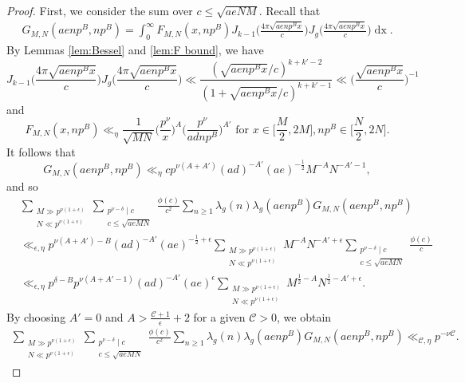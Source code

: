 \documentclass[12pt]{amsart}
\theoremstyle{plain}
\theoremstyle{definition}
\begin{document}
\begin{proof}
First, we consider the sum over $c\leq \sqrt{aeNM}$. Recall that
    \begin{align*}
    G_{M,N}(aenp^B, np^B)
    = \int_0^\infty F_{M, N}(x, np^B)
    J_{k-1}\Big(\frac{4\pi \sqrt{aenp^B x}}{c}\Big)
    J_{g}\Big(\frac{4\pi \sqrt{aenp^B x}}{c}\Big)
    \mathop{dx}.
    \end{align*}
By Lemmas \ref{lem:Bessel} and \ref{lem:F bound}, we have 
    \[
     J_{k-1}\Big(\frac{4\pi \sqrt{aenp^B x}}{c}\Big)J_{g}\Big(\frac{4\pi \sqrt{aenp^B x}}{c}\Big)
  \ll
     \frac{(\sqrt{aenp^B x}/c)^{k+k'-2}}
     {(1+\sqrt{aenp^Bx}/c)^{k+k'-1}} \ll \bigg(\frac{\sqrt{aenp^Bx}}{c}\bigg)^{-1}
    \]
and    
    \[
    F_{M, N}(x, np^B)
    \ll_{\eta}  \frac{1}{\sqrt{MN}}
    \Big(\frac{p^\nu }{x}\Big)^{A}
    \Big(\frac{p^\nu}{adnp^B}\Big)^{A'} \,\, \text{for} \,\, x\in \Big[\frac{M}{2}, 2M\Big], np^B\in \Big[\frac{N}{2}, 2N\Big].
    \]
 It follows that       
 \[
    G_{M,N}(aenp^B, np^B)    \ll_{\eta}  c p^{\nu(A+A')}(ad)^{-A'}(ae)^{-\frac12}M^{-A}N^{-A'-1} , 
    \] 
    and so
    \begin{align*}
 & \sum_{\substack{M \gg p^{\nu(1+\epsilon)}\\N\ll p^{\nu(1+\epsilon)}}}   \sum_{\substack{p^{\nu-\delta} \mid c\\c\leq\sqrt{aeMN}}} \frac{\phi(c)}{c^2} 
    \sum_{n\geq 1}
    \lambda_g(n) \lambda_g(aenp^B) G_{M,N}(aenp^B, np^B)\\&\ll_{\epsilon,\eta}   
   p^{\nu(A+A')-B}(ad)^{-A'}(ae)^{-\frac12+\epsilon}  \sum_{\substack{M \gg p^{\nu(1+\epsilon)}\\N\ll p^{\nu(1+\epsilon)}}}   M^{-A}N^{-A'+\epsilon}\sum_{\substack{p^{\nu-\delta} \mid c\\c\leq\sqrt{aeMN}}} \frac{\phi(c)}{c} \\&\ll_{\epsilon,\eta}  p^{\delta-B} p^{\nu(A+A'-1)}(ad)^{-A'}(ae)^{\epsilon}  \sum_{\substack{M \gg p^{\nu(1+\epsilon)}\\N\ll p^{\nu(1+\epsilon)}}}   M^{\frac12-A}N^{\frac12-A'+\epsilon}.   
   \end{align*}
By choosing $A'=0$ and $A> \frac{\mathcal{C}+1}{\epsilon}+2$ for a given $\mathcal{C}>0$, we obtain
   \begin{align*}
  \sum_{\substack{M \gg p^{\nu(1+\epsilon)}\\N\ll p^{\nu(1+\epsilon)}}}   \sum_{\substack{p^{\nu-\delta} \mid c\\c\leq\sqrt{aeMN}}} \frac{\phi(c)}{c^2} 
    \sum_{n\geq 1}
    \lambda_g(n) \lambda_g(aenp^B) G_{M,N}(aenp^B, np^B)   \ll_{\mathcal{C},\eta}  p^{-\nu \mathcal{C}}.

\end{align*}
\end{proof}
\end{document}
